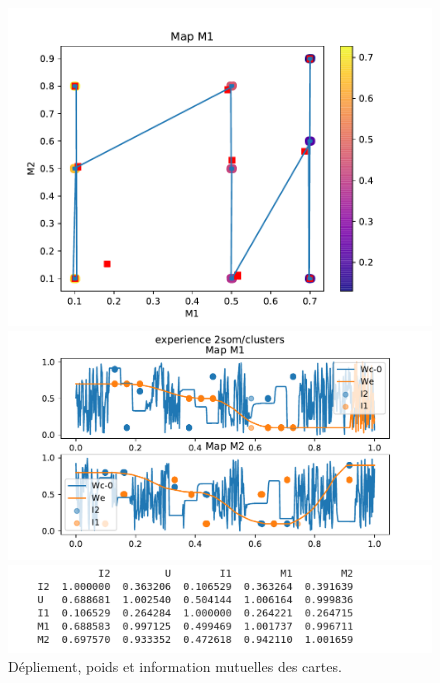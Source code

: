 \begin{figure}[h!]
\begin{minipage}{0.33\textwidth}
\centering\includegraphics[width=\textwidth]{2som_cluster_din}
\end{minipage}
\begin{minipage}{0.33\textwidth}
\centering\includegraphics[width=\textwidth]{2som_cluster_w}
\end{minipage}
\begin{minipage}{0.33\textwidth}
\centering\includegraphics[width=\textwidth]{2som_clusterssmall_im.png}
\end{minipage}
\caption{Dépliement, poids et information mutuelles des cartes. }
\label{fig:cluster}
\end{figure}

